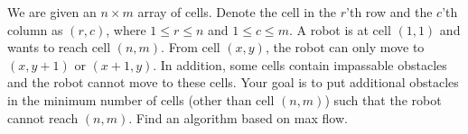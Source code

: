 \problem{}
We are given an $n \times m$ array of cells. Denote the cell in the $r$'th row and the $c$'th column as $(r,c)$, where $1 \leq r \leq n$ and $1 \leq c \leq m$. A robot is at cell $(1, 1)$ and wants to reach cell $(n, m)$. From cell $(x, y)$, the robot can only move to $(x,y+1)$ or $(x+1,y)$. In addition, some cells contain impassable obstacles and the robot cannot move to these cells. Your goal is to put additional obstacles in the minimum number of cells (other than cell $(n, m)$) such that the robot cannot reach $(n, m)$.  Find an algorithm based on max flow.  

\solution{}








\newpage
